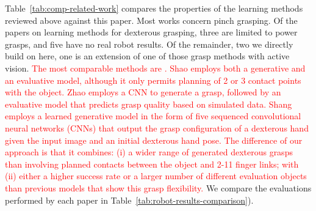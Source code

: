 Table~\ref{tab:comp-related-work} compares the properties of the learning methods reviewed above against this paper. Most works concern pinch grasping. Of the papers on learning methods for dexterous grasping, three \cite{varley2015generating,lu2017planning,detry2013a} are limited to power grasps, and five have no real robot results\cite{veres2017modeling,zhou20176dof,kappler2015leveraging,mandikal2021dexterous,Zhu2021}. Of the remainder, two we directly build on here, one is an extension of one of those grasp methods with active vision. \textcolor{red}{The most comparable methods are \cite{Shao2020,Shang2020,Zhao2020}. Shao \cite{Shao2020} employs both a generative and an evaluative model, although it only permits planning of 2 or 3 contact points with the object. Zhao \cite{Zhao2020} employs a CNN to generate a grasp, followed by an evaluative model that predicts grasp quality based on simulated data. Shang \cite{Shang2020} employs a learned generative model in the form of five sequenced convolutional neural networks (CNNs) that output the grasp configuration of a dexterous hand given the input image and an initial dexterous hand pose. The difference of our approach is that it combines: (i) a wider range of generated dexterous grasps than \cite{varley2015generating,lu2017planning,detry2013a,Shao2020} involving planned contacts between the object and 2-11 finger links; with (ii) either a higher success rate or a larger number of different evaluation objects than previous models that show this grasp flexibility.} We compare the evaluations performed by each paper in Table~\ref{tab:robot-results-comparison}). 


